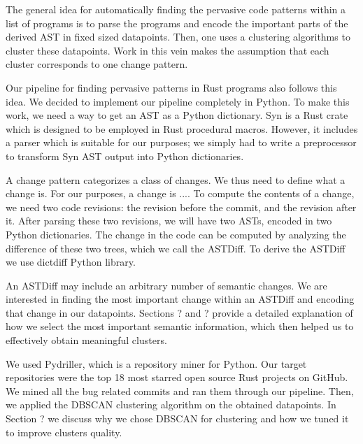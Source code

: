 The general idea for automatically finding the pervasive code patterns within a list of programs is to parse the programs and encode the important parts of the derived AST in fixed sized datapoints. Then, one uses a clustering algorithms to cluster these datapoints. Work in this vein makes the assumption that each cluster corresponds to one change pattern.

Our pipeline for finding pervasive patterns in Rust programs also follows this idea. We decided to implement our pipeline completely in Python. To make this work, we need a way to get an AST as a Python dictionary. Syn is a Rust crate which is designed to be employed in Rust procedural macros. However, it includes a parser which is suitable for our purposes; we simply had to write a preprocessor to transform Syn AST output into Python dictionaries.

A change pattern categorizes a class of changes. We thus need to define what a change is. For our purposes, a change is ....
To compute the contents of a change, we need two code revisions: the revision before the commit, and the revision after it. After parsing these two revisions, we will have two ASTs, encoded in two Python dictionaries. The change in the code can be computed by analyzing the difference of these two trees, which we call the ASTDiff. To derive the ASTDiff we use dictdiff Python library. 

An ASTDiff may include an arbitrary number of semantic changes. We are interested in finding the most important change within an ASTDiff and encoding that change in our datapoints. Sections ? and ? provide a detailed explanation of how we select the most important semantic information, which then helped us to effectively obtain meaningful clusters. %

We used Pydriller, which is a repository miner for Python. Our target repositories were the top 18 most starred open source Rust projects on GitHub. We mined all the bug related commits and ran them through our pipeline. Then, we applied the DBSCAN clustering algorithm on the obtained datapoints. In Section ? we discuss why we chose DBSCAN for clustering and how we tuned it to improve clusters quality. 

